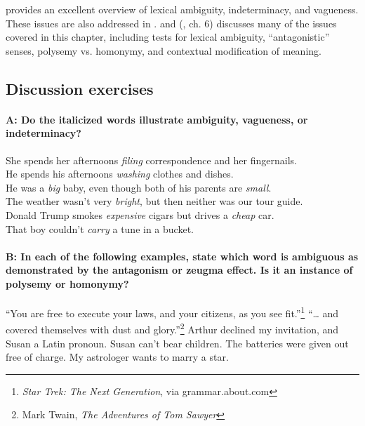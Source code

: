 \furtherreading



\citet{Kennedy2011} provides an excellent overview of lexical ambiguity, indeterminacy, and vagueness. These issues are also addressed in \citet{Gillon1990}. \citet[ch. 3]{Cruse1986} and (\citeyear*{Cruse2000}, ch. 6) discusses many of the issues covered in this chapter, including tests for lexical ambiguity, “antagonistic” senses, polysemy vs. homonymy, and contextual modification of meaning.


\subsection*{Discussion exercises}
\paragraph*{A: Do the italicized words illustrate ambiguity, vagueness, or indeterminacy?}
\ea
\ea She spends her afternoons \textit{filing} correspondence and her fingernails.\\
\ex He spends his afternoons \textit{washing} clothes and dishes.\\
\ex He was a \textit{big} baby, even though both of his parents are \textit{small}.\\
\ex The weather wasn’t very \textit{bright}, but then neither was our tour guide.\\
\ex Donald Trump smokes \textit{expensive} cigars but drives a \textit{cheap} car.\\
\ex That boy couldn’t \textit{carry} a tune in a bucket.
                       \z
\z


\paragraph*{B: In each of the following examples, state which word is ambiguous as demonstrated by the antagonism or zeugma effect. Is it an instance of polysemy or homonymy?}

\ea
  \ea “You are free to execute your laws, and your citizens, as you see fit.”\footnote{\textit{Star Trek: The Next Generation}, via grammar.about.com}
\ex  “… and covered themselves with dust and glory.”\footnote{Mark Twain, \textit{The Adventures of Tom Sawyer}}
\ex  Arthur declined my invitation, and Susan a Latin pronoun.
\ex Susan can’t bear children.
\ex  The batteries were given out free of charge.
\ex My astrologer wants to marry a star.
\z
\z

